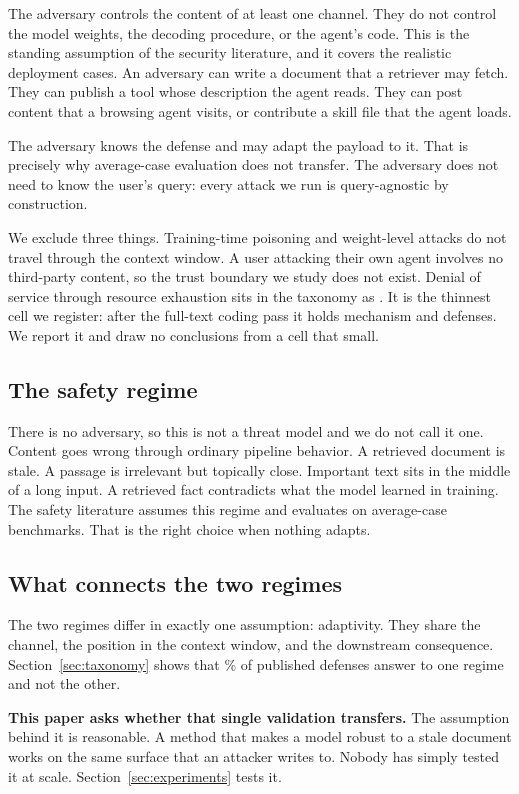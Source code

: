 The adversary controls the content of at least one channel. They do not
control the model weights, the decoding procedure, or the agent's code. This
is the standing assumption of the security literature, and it covers the realistic
deployment cases. An adversary can write a document that a retriever may
fetch. They can publish a tool whose description the agent reads. They can
post content that a browsing agent visits, or contribute a skill file that the
agent loads.

The adversary knows the defense and may adapt the payload to it. That is
precisely why average-case evaluation does not transfer. The adversary does
not need to know the user's query: every attack we run is query-agnostic by
construction.

We exclude three things. Training-time poisoning and weight-level attacks do
not travel through the context window. A user attacking their own agent
involves no third-party content, so the trust boundary we study does not
exist. Denial of service through resource exhaustion sits in the taxonomy as
. It is the thinnest cell we register: after the full-text
coding pass it holds \NMechResourceAbuse{} mechanism and
\NDefResourceAbuse{} defenses. We report it and draw no conclusions from a
cell that small.

\subsection{The safety regime}

There is no adversary, so this is not a threat model and we do not call it
one. Content goes wrong through ordinary pipeline behavior.
A retrieved document is stale. A passage is irrelevant but topically close.
Important text sits in the middle of a long input. A retrieved fact
contradicts what the model learned in training. The safety literature assumes this regime and evaluates on average-case benchmarks. That is the right
choice when nothing adapts.

\subsection{What connects the two regimes}

The two regimes differ in exactly one assumption: adaptivity. They share the
channel, the position in the context window, and the downstream consequence.
Section~\ref{sec:taxonomy} shows that \PctOneRegime{}\% of published defenses
answer to one regime and not the other.

\textbf{This paper asks whether that single validation transfers.} The
assumption behind it is reasonable. A method that makes a model robust to a
stale document works on the same surface that an attacker writes to. Nobody
has simply tested it at scale. Section~\ref{sec:experiments} tests it.

